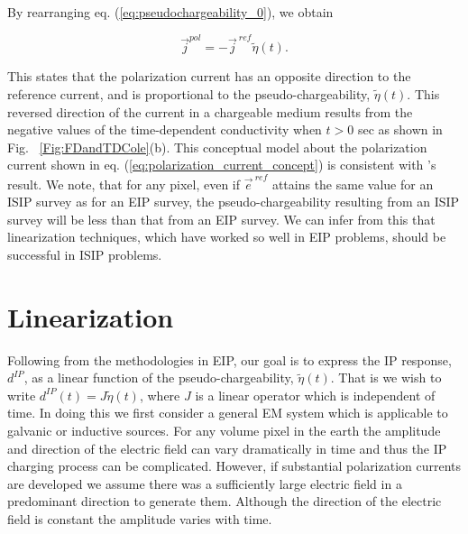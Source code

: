 \documentclass[extra,mreferee]{gji}
\renewcommand {\j}  { {\vec j} }
\newcommand {\e}  { {\vec e} }
\newcommand{\peta}{\tilde{\eta}}
\newcommand{\eref}{\e^{\ ref}}
\newcommand{\jref}{\j^{\ ref}}
\newcommand{\dip}{d^{IP}}
\begin{document}
By rearranging eq. (\ref{eq:pseudochargeability_0}), we obtain
\begin{linenomath*}
\begin{equation}
  \j^{pol} = -\jref\peta(t).
  \label{eq:polarization_current_concept}
\end{equation}
\end{linenomath*}
This states that the polarization current has an opposite direction to the reference current, and is proportional to the pseudo-chargeability, $\peta(t)$.
This reversed direction of the current in a chargeable medium results from the negative values of the time-dependent conductivity when $t>$0 sec as shown in Fig. ~\ref{Fig:FDandTDCole}(b).
This conceptual model about the polarization current shown in eq. (\ref{eq:polarization_current_concept}) is consistent with \cite{seigel1959}'s result. We note, that for any pixel, even if  $\eref$  attains the same value for an ISIP survey as for an EIP survey, the pseudo-chargeability resulting from an ISIP survey will be less than that from an EIP survey. We can infer from this that linearization techniques, which have worked so well in EIP problems, should be successful in ISIP problems.

\section{Linearization}
Following from the methodologies in EIP, our goal is to express the IP response, $\dip$, as a linear function of the pseudo-chargeability,  $\peta(t)$. That is we wish to write  $\dip(t) = J\peta(t)$, where $J$ is a linear operator which is independent of time. In doing this we first consider a general EM system which is applicable to galvanic or inductive sources.
For any volume pixel in the earth the amplitude and direction of the  electric field can vary dramatically in time and thus the IP charging process can be complicated. However, if substantial polarization currents are developed we assume there was a sufficiently large electric field in a predominant direction to generate them. Although the direction of the electric field is constant the amplitude varies with time.
\end{document}
